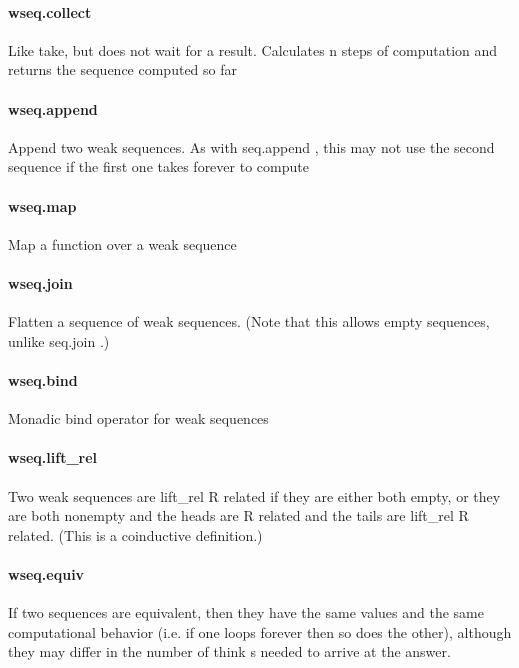 \documentclass{article}
\begin{document}
\paragraph{wseq.collect}
\par
Like take, but does not wait for a result. Calculates 
\colorbox[RGB]{253,246,227}{{{{\color[RGB]{101, 123, 131} n }}}} steps of
computation and returns the sequence computed so far
\paragraph{wseq.append}
\par
Append two weak sequences. As with 
\colorbox[RGB]{253,246,227}{{{{\color[RGB]{101, 123, 131} seq.append }}}}, this may not use
the second sequence if the first one takes forever to compute
\paragraph{wseq.map}
\par
Map a function over a weak sequence
\paragraph{wseq.join}
\par
Flatten a sequence of weak sequences. (Note that this allows
empty sequences, unlike 
\colorbox[RGB]{253,246,227}{{{{\color[RGB]{101, 123, 131} seq.join }}}}.)
\paragraph{wseq.bind}
\par
Monadic bind operator for weak sequences
\paragraph{wseq.lift\_rel}
\par
Two weak sequences are 
\colorbox[RGB]{253,246,227}{{{{\color[RGB]{101, 123, 131} lift\_rel R }}}} related if they are either both empty,
or they are both nonempty and the heads are 
\colorbox[RGB]{253,246,227}{{{{\color[RGB]{101, 123, 131} R }}}} related and the tails are
\colorbox[RGB]{253,246,227}{{{{\color[RGB]{101, 123, 131} lift\_rel R }}}} related. (This is a coinductive definition.)
\paragraph{wseq.equiv}
\par
If two sequences are equivalent, then they have the same values and
the same computational behavior (i.e. if one loops forever then so does
the other), although they may differ in the number of 
\colorbox[RGB]{253,246,227}{{{{\color[RGB]{101, 123, 131} think }}}}s needed to
arrive at the answer.
\end{document}
